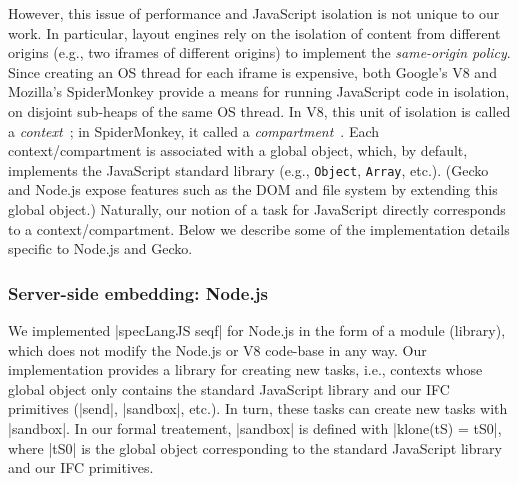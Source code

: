 However, this issue of performance and JavaScript isolation is not
unique to our work. 
%
In particular, layout engines rely on the isolation of content from
different origins (e.g., two iframes of different origins) to
implement the \emph{same-origin policy}.
%
Since creating an OS thread for each iframe is expensive, both
Google's V8 and Mozilla's SpiderMonkey provide a means for running
JavaScript code in isolation, on disjoint sub-heaps of the same OS
thread.
%
In V8, this unit of isolation is called a \emph{context}~\tocite{}; in
SpiderMonkey, it called a \emph{compartment}~\tocite{}.
%
Each context/compartment is associated with a global object, which, by
default, implements the JavaScript standard library (e.g.,
\verb|Object|, \verb|Array|, etc.).
%
(Gecko and Node.js expose features such as the DOM and
file system by extending this global object.)
%
Naturally, our notion of a task for JavaScript directly corresponds to
a context/compartment.
%
Below we describe some of the implementation details specific to
Node.js and Gecko.

\subsubsection{Server-side embedding: Node.js}

We implemented |specLangJS seqf| for Node.js in the form of a module
(library), which does not modify the Node.js or V8 code-base in any
way.
%
Our implementation provides a library for creating new tasks, i.e.,
contexts whose global object only contains the standard JavaScript
library and our IFC primitives (|send|, |sandbox|, etc.).
%
In turn, these tasks can create new tasks with |sandbox|.
%
In our formal treatement, |sandbox| is defined with |klone(tS) = tS0|,
where |tS0| is the global object corresponding to the standard
JavaScript library and our IFC primitives.
 
